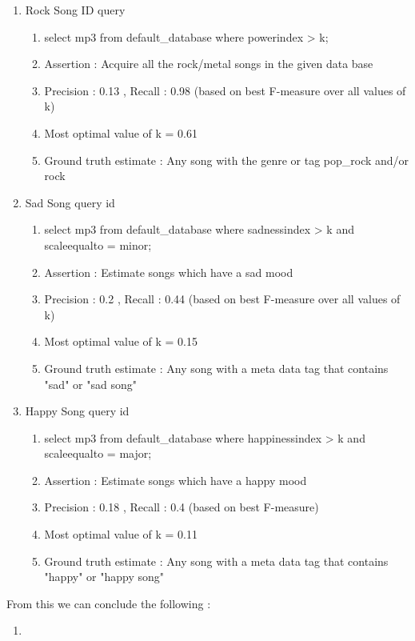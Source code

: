 \begin{enumerate}
\item Rock Song ID query
\begin{enumerate}
\item select mp3 from default\_database where powerindex > k;
\item Assertion : Acquire all the rock/metal songs in the given data base
\item Precision : 0.13 , Recall : 0.98 (based on best F-measure over all values of k)
\item Most optimal value of k = 0.61
\item Ground truth estimate : Any song with the genre or tag pop\_rock and/or rock
\end{enumerate}
\item Sad Song query id
\begin{enumerate}
\item select mp3 from default\_database where sadnessindex > k and scaleequalto = minor;
\item Assertion : Estimate songs which have a sad mood
\item Precision : 0.2 , Recall : 0.44 (based on best F-measure over all values of k)
\item Most optimal value of k = 0.15
\item Ground truth estimate : Any song with a meta data tag that contains "sad" or "sad song"
\end{enumerate}
\item Happy Song query id
\begin{enumerate}
\item select mp3 from default\_database where happinessindex > k and scaleequalto = major;
\item Assertion : Estimate songs which have a happy mood
\item Precision : 0.18 , Recall : 0.4 (based on best F-measure)
\item Most optimal value of k = 0.11
\item Ground truth estimate : Any song with a meta data tag that contains "happy" or "happy song"
\end{enumerate}

\end{enumerate}

From this we can conclude the following : 

\begin{enumerate}
\item 
\end{enumerate}

